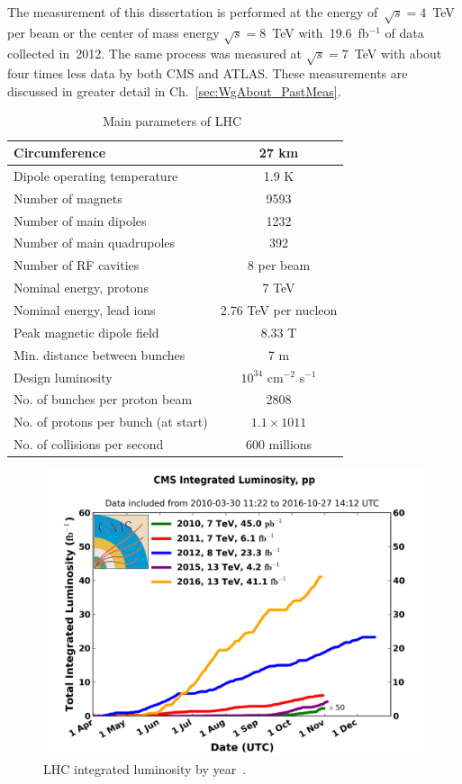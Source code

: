 The measurement of this dissertation is performed at the energy of~$\sqrt{s}=4$~TeV per beam or the center of mass energy $\sqrt{s}=8$~TeV with~19.6~fb$^{-1}$ of data collected in~2012. The same process was measured at $\sqrt{s}=7$~TeV with about four times less data by both CMS and ATLAS. These measurements are discussed in greater detail in Ch.~\ref{sec:WgAbout_PastMeas}.

\begin{table}[h]
  \begin{center}
  \caption{ Main parameters of LHC~\cite{ref_LHC_brochure}}
  \vspace{5 mm}
  \begin{tabular}{|l|c|}
     \hline
     Circumference & 27 km  \\ \hline
     Dipole operating temperature &  1.9 K \\ \hline
     Number of magnets &  9593 \\ \hline
     Number of main dipoles &  1232 \\ \hline
     Number of main quadrupoles &  392 \\ \hline
     Number of RF cavities &  8 per beam \\ \hline
     Nominal energy, protons &  7 TeV \\ \hline
     Nominal energy, lead ions &  2.76 TeV per nucleon \\ \hline
     Peak magnetic dipole field &  8.33 T \\ \hline
     Min. distance between bunches &  7 m \\ \hline
     Design luminosity &  $10^{34}$ cm$^{-2}$ s$^{-1}$ \\ \hline
     No. of bunches per proton beam &  2808 \\ \hline
     No. of protons per bunch (at start) &  $1.1\times 10{11}$ \\ \hline
     No. of collisions per second &  600 millions \\ \hline
  \end{tabular}
  \label{tab:LHCparameters}
  \end{center}
\end{table}

\begin{figure}
  \centering
  \includegraphics[width=.80\linewidth]{../figs/Exp/int_lumi_cumulative_pp_2.png}
  \caption{LHC integrated luminosity by year~\cite{ref_fig_LHClumi}.}
  \label{fig:LHClumi}
\end{figure}

